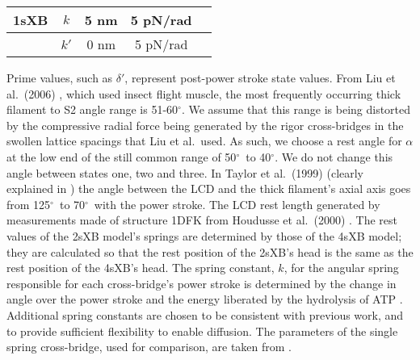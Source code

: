 \documentclass[10pt]{article}
\newcommand{\de}{$^\circ$} %
\newcommand{\citep}[1]{\cite{#1}} %
\newcommand{\citet}[1]{\cite{#1}} %
\begin{document}
\begin{table}[ht]
\begin{center}
\begin{tabular}[t]{|c|c|c|c|c|}
    1sXB  & $k$       & 5 nm       & 5 pN/rad   & \citet{Tanner2007} \\ \hline
          & $k'$      & 0 nm       & 5 pN/rad   & \citet{Tanner2007} \\ \hline
    \end{tabular}
    \end{center}
    \begin{flushleft}
	    Prime values, such as $\delta'$, represent post-power stroke state values. 
	    From Liu et al.~(2006) \citep{Liu2006}, which used insect flight muscle, the most frequently occurring thick filament to S2 angle range is 51-60\de. 
	    We assume that this range is being distorted by the compressive radial force being generated by the rigor cross-bridges in the swollen lattice spacings that Liu et al.~used. 
	    As such, we choose a rest angle for $\alpha$ at the low end of the still common range of 50\de~to 40\de. 
	    We do not change this angle between states one, two and three.
	    In Taylor et al.~(1999) \citep{Taylor1999} (clearly explained in \citep{Davis2009}) the angle between the LCD and the thick filament's axial axis goes from 125\de~to 70\de~with the power stroke. 
	    The LCD rest length generated by measurements made of structure 1DFK from Houdusse et al.~(2000) \citep{Houdusse2000}. 
	    The rest values of the 2sXB model's springs are determined by those of the 4sXB model; they are calculated so that the rest position of the 2sXB's head is the same as the rest position of the 4sXB's head. 
	    The spring constant, $k$, for the angular spring responsible for each cross-bridge's power stroke is determined by the change in angle over the power stroke and the energy liberated by the hydrolysis of ATP \citep{Tanner2007}. 
	    Additional spring constants are chosen to be consistent with previous work, and to provide sufficient flexibility to enable diffusion. 
        The parameters of the single spring cross-bridge, used for comparison, are taken from \citep{Tanner2007}.
    \end{flushleft}
	\label{parameter_table}
\end{table}

\end{document}
